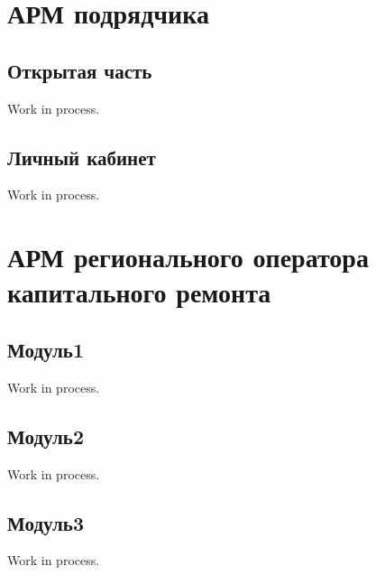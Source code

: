 
\section*{АРМ подрядчика}

\subsection*{Открытая часть}

Work in process.

\subsection*{Личный кабинет}

Work in process.

\section*{АРМ регионального оператора капитального ремонта}

\subsection*{Модуль1}

Work in process.

\subsection*{Модуль2}

Work in process.

\subsection*{Модуль3}

Work in process.